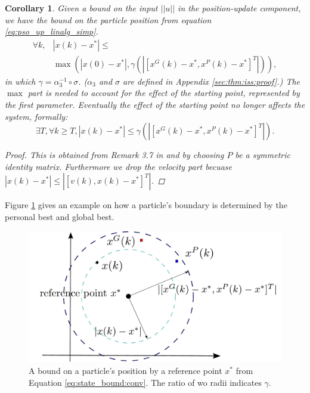 \documentclass{sig-alternate}
\newtheorem{mycoro}{Corollary}
\begin{document}
\begin{mycoro}
\label{coro:state_bound}
Given a bound on the input $ || u || $ in the position-update component, we have the bound on the particle position from equation \eqref{eq:pso_up_linalg_simp}.
\begin{equation}
\label{eq:state_bound}
\begin{aligned}
\forall k, 
& | x(k) - x^{*} | \leq \\
& \max \left( | x(0) - x^{*} | , \gamma ( | [ x^{G}(k) - x^{*}, x^{P}(k) - x^{*} ]^{T} | ) \right),
\end{aligned}
\end{equation}
in which $ \gamma = \alpha_{3}^{-1} \circ \sigma $.
($ \alpha_{3} $ and $ \sigma $ are defined in Appendix \ref{sec:thm:iss:proof}.)
The $ \max $ part is needed to account for the effect of the starting point, represented by the first parameter. Eventually the effect of the starting point no longer affects the system, formally:
\begin{equation}
\label{eq:state_bound:conv}
\exists T, \forall k \geq T, 
|  x(k) - x^{*} | \leq \gamma ( | [ x^{G}(k) - x^{*}, x^{P}(k) - x^{*} ]^{T} | ).
\end{equation}
\begin{proof}
This is obtained from Remark 3.7 in \cite{Jiang2001857} and by choosing $ P $ be a symmetric identity matrix.
Furthermore we drop the velocity part becuase $ | x(k) - x^{*} | \leq | [ v(k), x(k) - x^{*} ]^{T} | $.
\end{proof}
\end{mycoro}

Figure \ref{fig:boundary} gives an example on how a particle's boundary is determined by the personal best and global best.

\begin{figure}
\centering
\includegraphics[width=0.8\linewidth]{./boundary}
\caption{A bound on a particle's position by a reference point $ x^{*} $ from Equation \ref{eq:state_bound:conv}.
The ratio of wo radii indicates $ \gamma $.}
\label{fig:boundary}
\end{figure}
\end{document}
